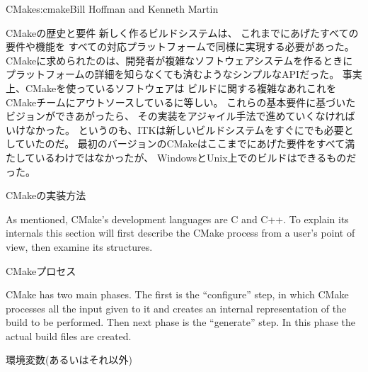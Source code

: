 \begin{aosachapter}{CMake}{s:cmake}{Bill Hoffman and Kenneth Martin}
\begin{aosasect1}{CMakeの歴史と要件}
新しく作るビルドシステムは、
これまでにあげたすべての要件や機能を
すべての対応プラットフォームで同様に実現する必要があった。
CMakeに求められたのは、開発者が複雑なソフトウェアシステムを作るときに
プラットフォームの詳細を知らなくても済むようなシンプルなAPIだった。
事実上、CMakeを使っているソフトウェアは
ビルドに関する複雑なあれこれを
CMakeチームにアウトソースしているに等しい。
これらの基本要件に基づいたビジョンができあがったら、
その実装をアジャイル手法で進めていくなければいけなかった。
というのも、ITKは新しいビルドシステムをすぐにでも必要としていたのだ。
最初のバージョンのCMakeはここまでにあげた要件をすべて満たしているわけではなかったが、
WindowsとUnix上でのビルドはできるものだった。

\end{aosasect1}

\begin{aosasect1}{CMakeの実装方法}

As mentioned, CMake's development languages are C and C++. To explain
its internals this section will first describe the CMake process from
a user's point of view, then examine its structures.

\begin{aosasect2}{CMakeプロセス}

CMake has two main phases. The first is the ``configure'' step, in which
CMake processes all the input given to it and creates an internal
representation of the build to be performed. Then next phase is the
``generate'' step. In this phase the actual build files are created.

\begin{aosasect3}{環境変数(あるいはそれ以外)}


\end{aosasect3}
\end{aosasect2}
\end{aosasect1}
\end{aosachapter}
